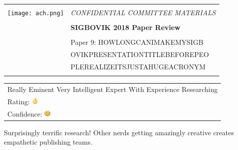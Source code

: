 \documentclass[12pt]{article}
\begin{document}
{\sffamily
\begin{tabular}{ll}
\multirow{3}{*}{\texttt{[image: ach.png]}}\\
& \Large{\em CONFIDENTIAL COMMITTEE MATERIALS} \\
&\\
& \textbf{\Huge{SIGBOVIK 2018 Paper Review}} \\
&\\
& \LARGE{Paper 9: HOWLONGCANIMAKEMYSIGB} \\[0.25em]
& \LARGE{OVIKPRESENTATIONTITLEBEFOREPEO} \\[0.25em]
& \LARGE{PLEREALIZEITSJUSTAHUGEACRONYM} \\
&\\
\hline
\end{tabular}}
\vspace{2em}
\thispagestyle{empty}

{\large\bf
\begin{tabular}{l}
Really Eminent Very Intelligent Expert With Experience Researching \\
Rating: \includegraphics[height=1em, trim=0 1.25em 0 0]{review-9-rating.png} \\
Confidence: \includegraphics[height=1em, trim=0 1.25em 0 0]{review-9-confidence.png} \\
\end{tabular}}
\vspace{1em}

Surprisingly
terrific
research!
Other
nerds
getting
amazingly
creative
creates
empathetic
publishing
teams.
\end{document}
